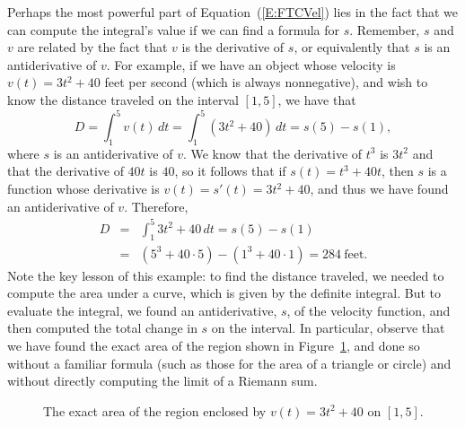 Perhaps the most powerful part of Equation~(\ref{E:FTCVel}) lies in the fact that we can compute the integral's value if we can find a formula for $s$.  Remember, $s$ and $v$ are related by the fact that $v$ is the derivative of $s$, or equivalently that $s$ is an antiderivative of $v$.  For example, if we have an object whose velocity is $v(t) = 3t^2 + 40$ feet per second (which is always nonnegative), and wish to know the distance traveled on the interval $[1,5]$, we have that
$$
D  =  \int_1^5 v(t) \,dt  =  \int_1^5 (3t^2 + 40) \, dt  =   s(5) - s(1),
$$
where $s$ is an antiderivative of $v$.  We know that the derivative of $t^3$ is $3t^2$ and that the derivative of $40t$ is $40$, so it follows that if $s(t) = t^3 + 40t$, then $s$ is a function whose derivative is $v(t) = s'(t) = 3t^2 + 40$, and thus we have found an antiderivative of $v$.  Therefore,
\begin{eqnarray*}
D & = & \int_1^5 3t^2 + 40 \, dt  = s(5) - s(1) \\
	& = & (5^3 + 40 \cdot 5) - (1^3 + 40\cdot 1) = 284 \ \mbox{feet}.
\end{eqnarray*} 
Note the key lesson of this example:  to find the distance traveled, we needed to compute the area under a curve, which is given by the definite integral.  But to evaluate the integral, we found an antiderivative, $s$, of the velocity function, and then computed the total change in $s$ on the interval.  In particular, observe that we have found the exact area of the region shown in Figure~\ref{F:4.4.FTCVel2}, and done so without a familiar formula (such as those for the area of a triangle or circle) and without directly computing the limit of a Riemann sum.
\begin{figure}[h]
\begin{center}
\caption{The exact area of the region enclosed by $v(t) = 3t^2 + 40$ on $[1,5]$.} \label{F:4.4.FTCVel2}
\end{center}
\end{figure}
